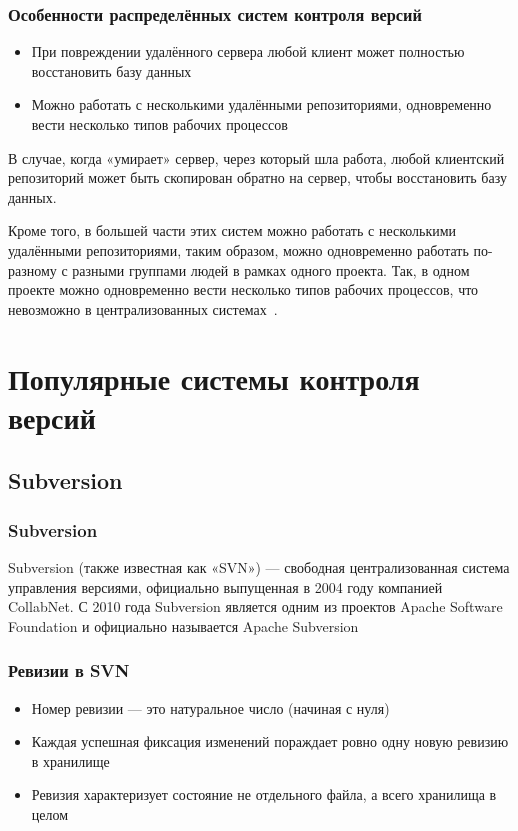 \documentclass{../industrial-development}
\begin{document}
\begin{frame} \frametitle{Особенности распределённых систем контроля версий}
  \begin{itemize}
  \item При повреждении удалённого сервера любой клиент может полностью восстановить базу данных
  \item Можно работать с несколькими удалёнными репозиториями, одновременно вести несколько типов рабочих процессов
  \end{itemize}
\end{frame}

\lecturenotes

В случае, когда «умирает» сервер, через который шла работа, любой клиентский репозиторий может быть скопирован обратно на сервер, чтобы восстановить базу данных. 

Кроме того, в большей части этих систем можно работать с несколькими удалёнными репозиториями, таким образом, можно одновременно работать по-разному с разными группами людей в рамках одного проекта. Так, в одном проекте можно одновременно вести несколько типов рабочих процессов, что невозможно в централизованных системах~\cite[с.~7]{ProGit}.

\section{Популярные системы контроля версий}

\subsection{Subversion}

\begin{frame} \frametitle{Subversion}
  \begin{block}{}
    \alert{Subversion (также известная как «SVN»)} --- свободная централизованная система управления версиями, официально выпущенная в 2004 году компанией CollabNet. С 2010 года Subversion является одним из проектов Apache Software Foundation и официально называется Apache Subversion
  \end{block}
\end{frame}

\begin{frame} \frametitle{Ревизии в SVN}
  
  \begin{itemize}
  \item Номер ревизии --- это натуральное число (начиная с нуля)
  \item Каждая успешная фиксация изменений пораждает ровно одну новую ревизию в хранилище
  \item Ревизия характеризует состояние не отдельного файла, а всего хранилища в целом
  \end{itemize}
\end{frame}
\end{document}
